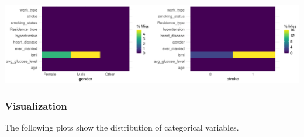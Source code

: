 \documentclass[
]{article}
\begin{document}
\includegraphics{Build-deploy-stroke-prediction-model-R_files/figure-latex/miss-distribution-plot-1.pdf}

\subsubsection{\texorpdfstring{\textbf{Visualization}}{Visualization}}\label{visualization}

The following plots show the distribution of categorical variables.
\end{document}
